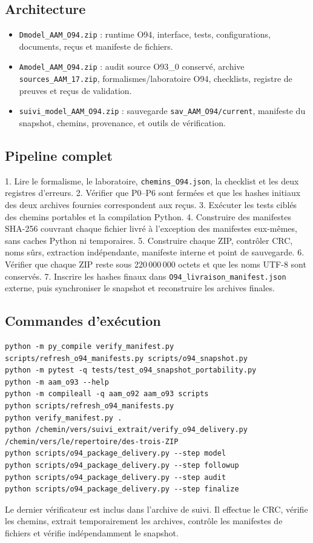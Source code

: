 \documentclass[11pt,a4paper]{article}
\begin{document}
\subsection{Architecture}
\begin{itemize}
\item \texttt{Dmodel\_AAM\_O94.zip} : runtime O94, interface, tests, configurations, documents, reçus et manifeste de fichiers.
\item \texttt{Amodel\_AAM\_O94.zip} : audit source O93\_0 conservé, archive \texttt{sources\_AAM\_17.zip}, formalismes/laboratoire O94, checklists, registre de preuves et reçus de validation.
\item \texttt{suivi\_model\_AAM\_O94.zip} : sauvegarde \texttt{sav\_AAM\_O94/current}, manifeste du snapshot, chemins, provenance, et outils de vérification.
\end{itemize}

\subsection{Pipeline complet}
1. Lire le formalisme, le laboratoire, \texttt{chemins\_O94.json}, la checklist et les deux registres d'erreurs.
2. Vérifier que P0--P6 sont fermées et que les hashes initiaux des deux archives fournies correspondent aux reçus.
3. Exécuter les tests ciblés des chemins portables et la compilation Python.
4. Construire des manifestes SHA-256 couvrant chaque fichier livré à l'exception des manifestes eux-mêmes, sans caches Python ni temporaires.
5. Construire chaque ZIP, contrôler CRC, noms sûrs, extraction indépendante, manifeste interne et point de sauvegarde.
6. Vérifier que chaque ZIP reste sous 220\,000\,000 octets et que les noms UTF-8 sont conservés.
7. Inscrire les hashes finaux dans \texttt{O94\_livraison\_manifest.json} externe, puis synchroniser le snapshot et reconstruire les archives finales.

\subsection{Commandes d'exécution}
\begin{verbatim}
python -m py_compile verify_manifest.py scripts/refresh_o94_manifests.py scripts/o94_snapshot.py
python -m pytest -q tests/test_o94_snapshot_portability.py
python -m aam_o93 --help
python -m compileall -q aam_o92 aam_o93 scripts
python scripts/refresh_o94_manifests.py
python verify_manifest.py .
python /chemin/vers/suivi_extrait/verify_o94_delivery.py /chemin/vers/le/repertoire/des-trois-ZIP
python scripts/o94_package_delivery.py --step model
python scripts/o94_package_delivery.py --step followup
python scripts/o94_package_delivery.py --step audit
python scripts/o94_package_delivery.py --step finalize
\end{verbatim}
Le dernier vérificateur est inclus dans l'archive de suivi. Il effectue le CRC, vérifie les chemins, extrait temporairement les archives, contrôle les manifestes de fichiers et vérifie indépendamment le snapshot.
\end{document}
